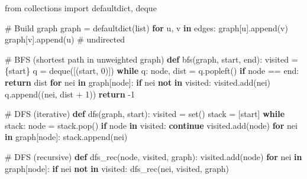 \documentclass[11pt]{article}
\newenvironment{Shaded}{\begin{snugshade}}{\end{snugshade}}
\newcommand{\BuiltInTok}[1]{\textcolor[rgb]{0.50,0.55,0.55}{#1}}
\newcommand{\CommentTok}[1]{\textcolor[rgb]{0.48,0.49,0.49}{#1}}
\newcommand{\ControlFlowTok}[1]{\textcolor[rgb]{0.99,0.74,0.29}{\textbf{#1}}}
\newcommand{\DecValTok}[1]{\textcolor[rgb]{0.96,0.45,0.00}{#1}}
\newcommand{\ImportTok}[1]{\textcolor[rgb]{0.15,0.68,0.38}{#1}}
\newcommand{\KeywordTok}[1]{\textcolor[rgb]{0.81,0.81,0.76}{\textbf{#1}}}
\newcommand{\NormalTok}[1]{\textcolor[rgb]{0.81,0.81,0.76}{#1}}
\newcommand{\OperatorTok}[1]{\textcolor[rgb]{0.81,0.81,0.76}{#1}}
\begin{document}
\begin{Shaded}
\begin{Highlighting}[]
\ImportTok{from}\NormalTok{ collections }\ImportTok{import}\NormalTok{ defaultdict, deque}

\CommentTok{\# Build graph}
\NormalTok{graph }\OperatorTok{=}\NormalTok{ defaultdict(}\BuiltInTok{list}\NormalTok{)}
\ControlFlowTok{for}\NormalTok{ u, v }\KeywordTok{in}\NormalTok{ edges:}
\NormalTok{    graph[u].append(v)}
\NormalTok{    graph[v].append(u)  }\CommentTok{\# undirected}

\CommentTok{\# BFS (shortest path in unweighted graph)}
\KeywordTok{def}\NormalTok{ bfs(graph, start, end):}
\NormalTok{    visited }\OperatorTok{=}\NormalTok{ \{start\}}
\NormalTok{    q }\OperatorTok{=}\NormalTok{ deque([(start, }\DecValTok{0}\NormalTok{)])}
    \ControlFlowTok{while}\NormalTok{ q:}
\NormalTok{        node, dist }\OperatorTok{=}\NormalTok{ q.popleft()}
        \ControlFlowTok{if}\NormalTok{ node }\OperatorTok{==}\NormalTok{ end: }\ControlFlowTok{return}\NormalTok{ dist}
        \ControlFlowTok{for}\NormalTok{ nei }\KeywordTok{in}\NormalTok{ graph[node]:}
            \ControlFlowTok{if}\NormalTok{ nei }\KeywordTok{not} \KeywordTok{in}\NormalTok{ visited:}
\NormalTok{                visited.add(nei)}
\NormalTok{                q.append((nei, dist }\OperatorTok{+} \DecValTok{1}\NormalTok{))}
    \ControlFlowTok{return} \OperatorTok{{-}}\DecValTok{1}

\CommentTok{\# DFS (iterative)}
\KeywordTok{def}\NormalTok{ dfs(graph, start):}
\NormalTok{    visited }\OperatorTok{=} \BuiltInTok{set}\NormalTok{()}
\NormalTok{    stack }\OperatorTok{=}\NormalTok{ [start]}
    \ControlFlowTok{while}\NormalTok{ stack:}
\NormalTok{        node }\OperatorTok{=}\NormalTok{ stack.pop()}
        \ControlFlowTok{if}\NormalTok{ node }\KeywordTok{in}\NormalTok{ visited: }\ControlFlowTok{continue}
\NormalTok{        visited.add(node)}
        \ControlFlowTok{for}\NormalTok{ nei }\KeywordTok{in}\NormalTok{ graph[node]:}
\NormalTok{            stack.append(nei)}

\CommentTok{\# DFS (recursive)}
\KeywordTok{def}\NormalTok{ dfs\_rec(node, visited, graph):}
\NormalTok{    visited.add(node)}
    \ControlFlowTok{for}\NormalTok{ nei }\KeywordTok{in}\NormalTok{ graph[node]:}
        \ControlFlowTok{if}\NormalTok{ nei }\KeywordTok{not} \KeywordTok{in}\NormalTok{ visited:}
\NormalTok{            dfs\_rec(nei, visited, graph)}


\end{Highlighting}
\end{Shaded}
\end{document}
